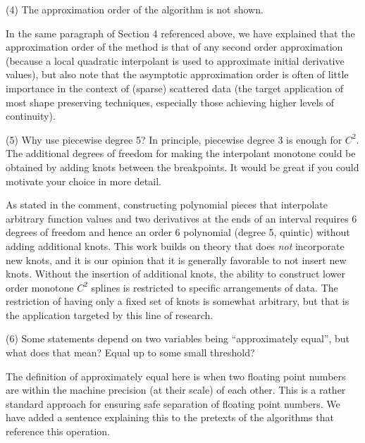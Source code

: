 \goodbreak
{\parindent=20pt \it

\item{(4)} The approximation order of the algorithm is not shown.

}

In the same paragraph of Section 4 referenced above, we have explained
that the approximation order of the method is that of any second order
approximation (because a local quadratic interpolant is used to
approximate initial derivative values), but also note that the
asymptotic approximation order is often of little importance in the
context of (sparse) scattered data (the target application of most
shape preserving techniques, especially those achieving higher levels
of continuity).


\goodbreak
{\parindent=20pt \it

\item{(5)} Why use piecewise degree 5? In principle, piecewise degree 3
  is enough for $C^2$. The additional degrees of freedom for making
  the interpolant monotone could be obtained by adding knots between
  the breakpoints. It would be great if you could motivate your choice
  in more detail.

}

As stated in the comment, constructing polynomial pieces that
interpolate arbitrary function values and two derivatives at the ends
of an interval requires 6 degrees of freedom and hence an order 6
polynomial (degree 5, quintic) without adding additional knots. This
work builds on theory that does {\it not} incorporate new knots, and
it is our opinion that it is generally favorable to not insert new
knots. Without the insertion of additional knots, the ability to
construct lower order monotone $C^2$ splines is restricted to specific
arrangements of data. The restriction of having only a fixed set of
knots is somewhat arbitrary, but that is the application targeted by
this line of research.


\goodbreak
{\parindent=20pt \it

\item{(6)} Some statements depend on two variables being
  ``approximately equal'', but what does that mean? Equal up to some
  small threshold?

}

The definition of approximately equal here is when two floating point
numbers are within the machine precision (at their scale) of each other.
This is a rather standard approach for ensuring safe separation of
floating point numbers. We have added a sentence explaining this to
the pretexts of the algorithms that reference this operation.


